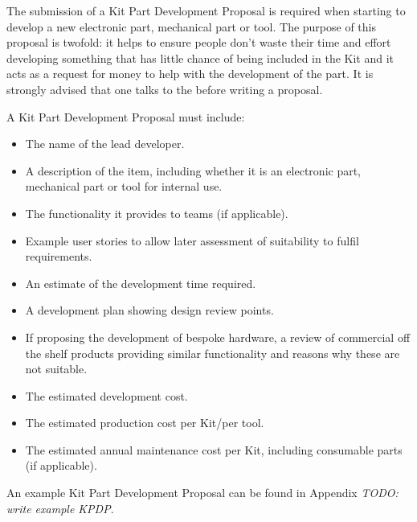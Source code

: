 \begin{draft}
The submission of a Kit Part Development Proposal is required when starting to develop a new electronic part, mechanical part or tool. The purpose of this proposal is twofold: it helps to ensure people don't waste their time and effort developing something that has little chance of being included in the Kit and it acts as a request for money to help with the development of the part. It is strongly advised that one talks to the  before writing a proposal.

A Kit Part Development Proposal must include:
\begin{itemize}
  \item The name of the lead developer.
  \item A description of the item, including whether it is an electronic part, mechanical part or tool for internal use.
  \item The functionality it provides to teams (if applicable).
  \item Example user stories to allow later assessment of suitability to fulfil requirements.
  \item An estimate of the development time required.
  \item A development plan showing design review points.
  \item If proposing the development of bespoke hardware, a review of commercial off the shelf products providing similar functionality and reasons why these are not suitable.
  \item The estimated development cost.
  \item The estimated production cost per Kit/per tool.
  \item The estimated annual maintenance cost per Kit, including consumable parts (if applicable).
\end{itemize}

An example Kit Part Development Proposal can be found in Appendix \emph{TODO: write example KPDP}.


\end{draft}
